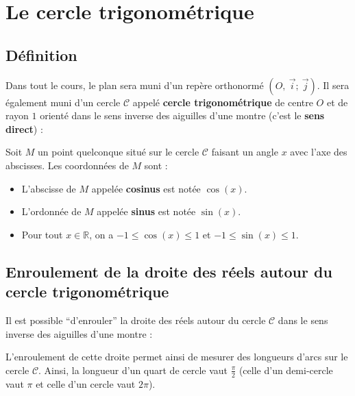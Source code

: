 



	\section{Le cercle trigonométrique}

	\subsection{Définition}

	Dans tout le cours, le plan sera muni d'un repère orthonormé $(O,\ \overrightarrow{i} ;\ \overrightarrow{j})$. Il sera également muni d'un cercle $\mathcal{C}$ appelé \textbf{cercle trigonométrique} de centre $O$ et de rayon $1$ orienté dans le sens inverse des aiguilles d'une montre (c'est le \textbf{sens direct}) :


	\begin{formula}
		Soit $M$ un point quelconque situé sur le cercle $\mathcal{C}$ faisant un angle $x$ avec l'axe des abscisses. Les coordonnées de $M$ sont :
		\begin{itemize}
			\item L'abscisse de $M$ appelée \textbf{cosinus} est notée $\cos(x)$.
			\item L'ordonnée de $M$ appelée \textbf{sinus} est notée $\sin(x)$.
			\item Pour tout $x \in \mathbb{R}$, on a $-1 \leq \cos(x) \leq 1$ et $-1 \leq \sin(x) \leq 1$.
		\end{itemize}
	\end{formula}

	\subsection{Enroulement de la droite des réels autour du cercle trigonométrique}

	Il est possible ``d'enrouler'' la droite des réels autour du cercle $\mathcal{C}$ dans le sens inverse des aiguilles d'une montre :

	\begin{tip}
		L'enroulement de cette droite permet ainsi de mesurer des longueurs d'arcs sur le cercle $\mathcal{C}$. Ainsi, la longueur d'un quart de cercle vaut $\displaystyle{\frac{\pi}{2}}$ (celle d'un demi-cercle vaut $\pi$ et celle d'un cercle vaut $2\pi$).
	\end{tip}

